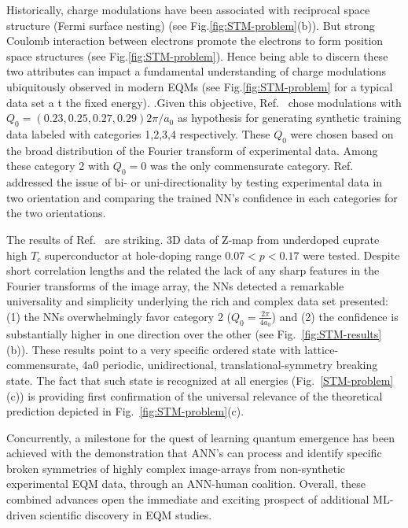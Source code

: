 \documentclass[aps,prb,floatfix,amsmath,amssymb,amsfonts,10pt,floatfix,longbibliography]{revtex4-1}
\begin{document}
\begin{enumerate}
 

Historically, charge modulations have been associated with reciprocal space structure (Fermi surface nesting)\cite{gruner} (see Fig.\ref{fig:STM-problem}(b)). But
  strong Coulomb interaction between electrons promote the electrons to form position space structures (see Fig.\ref{fig:STM-problem}). 
 Hence being able to discern these two attributes can impact a fundamental understanding of charge modulations ubiquitously observed in modern EQMs \cite{Abbamonte2005,Ghiringhelli2012,Kogar2017,Zhang2016,Gerber2015,Bugaris2017,CoBaNi2As2} (see Fig.\ref{fig:STM-problem} for a typical data set a t the fixed energy). 
\cite{Robertson2006,DelMaestro2006}.Given this objective, Ref.~\cite{Zhang2018} chose  modulations with $Q_0=(0.23, 0.25, 0.27, 0.29)2\pi/a_0$ as hypothesis  for generating synthetic training data labeled with categories 1,2,3,4 respectively. These $Q_0$ were chosen based on the broad distribution of the Fourier transform of experimental data. Among these category 2 with $Q_0=0$ was the only commensurate category. 
 Ref.~\cite{Zhang2018} addressed the issue of bi- or uni-directionality by testing experimental data in two orientation and comparing the trained NN's confidence in each categories for the two orientations. 

The results of Ref.~\cite{Zhang2018} are striking. 3D data  of Z-map from underdoped cuprate high $T_c$ superconductor at hole-doping range $0.07<p<0.17$ were tested. Despite short correlation lengths and the related the lack of any sharp features in the  Fourier transforms of the image array, the NNs detected a remarkable universality and simplicity underlying the rich and complex data set presented:
(1) the NNs overwhelmingly favor category 2 ($Q_0=\frac{2\pi}{4a_0}$) and (2) the confidence is substantially higher in one direction over the other (see Fig.~\ref{fig:STM-results}(b)). These results point to 
a very specific ordered state with lattice-commensurate, 4a0 periodic, unidirectional, translational-symmetry breaking state. The fact that such state is recognized at all energies (Fig.~\ref{STM-problem}(c)) 
is providing first confirmation of the universal relevance of the theoretical prediction\cite{Zaanen1989,Loew1994, Vojta1999,White1998a,Capponi2002, Corboz2014,Fischer2014}  depicted in Fig.~\ref{fig:STM-problem}(c). 

Concurrently, a milestone for the quest of learning quantum emergence
has been achieved with the demonstration that ANN’s can process and identify specific broken symmetries of highly complex image-arrays from non-synthetic experimental EQM data, through an ANN-human coalition. Overall, these combined advances open the immediate and exciting prospect of additional ML-driven scientific discovery in EQM studies. 




\end{enumerate}
\end{document}
